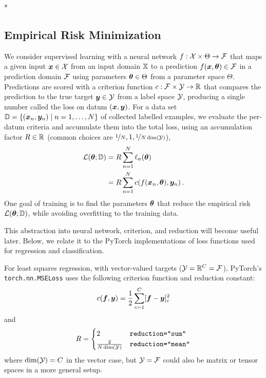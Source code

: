 \switchcolumn[1]*
\switchcolumn[0]

\subsection{Empirical Risk Minimization}

We consider supervised learning with a neural network $f: {\mathcal{X}} \times \Theta \to {\mathcal{F}}$ that maps a given input ${\bm{x}} \in {\mathcal{X}}$ from an input domain ${\mathbb{X}}$ to a prediction $f({\bm{x}}, {\bm{\theta}}) \in {\mathcal{F}}$ in a prediction domain ${\mathcal{F}}$ using parameters ${\bm{\theta}} \in \Theta$ from a parameter space $\Theta$.
Predictions are scored with a criterion function $c: {\mathcal{F}} \times {\mathcal{Y}} \to {\mathbb{R}}$ that compares the prediction to the true target ${\bm{y}} \in {\mathcal{Y}}$ from a label space ${\mathcal{Y}}$, producing a single number called the loss on datum $({\bm{x}}, {\bm{y}})$.
For a data set ${\mathbb{D}} = \{({\bm{x}}_n, {\bm{y}}_n) \mid n=1, \dots, N\}$ of collected labelled examples, we evaluate the per-datum criteria and accumulate them into the total loss, using an accumulation factor $R \in {\mathbb{R}}$ (common choices are $\nicefrac{1}{N}, 1, \nicefrac{1}{N \dim({\mathcal{Y}})}$),
\begin{align}\label{eq:empirical_risk}
  \begin{split}
    {\mathcal{L}}({\bm{\theta}}; {\mathbb{D}}) &= R \sum_{n=1}^N \ell_n({\bm{\theta}})
    \\
                      &= R \sum_{n=1}^N c(f({\bm{x}}_n, {\bm{\theta}}), {\bm{y}}_n)\,.
  \end{split}
\end{align}
One goal of training is to find the parameters ${\bm{\theta}}$ that reduce the empirical risk ${\mathcal{L}}({\bm{\theta}}; {\mathbb{D}})$, while avoiding overfitting to the training data.

This abstraction into neural network, criterion, and reduction will become useful later.
Below, we relate it to the PyTorch implementations of loss functions used for regression and classification.

\begin{example}\label{ex:square_loss}
  For least squares regression, with vector-valued targets (${\mathcal{Y}} = {\mathbb{R}}^C = {\mathcal{F}}$), PyTorch's \texttt{torch.nn.MSELoss} uses the following criterion function and reduction constant:
  \begin{align*}
    c({\bm{f}}, {\bm{y}})
    =
    \frac{1}{2}\sum_{c=1}^C [{\bm{f}} - {\bm{y}}]_c^2
  \end{align*}
  and
  \begin{align*}
    R
    =
    \begin{cases}
      2 & \text{\texttt{reduction="sum"}}
      \\
      \frac{2}{N \dim({\mathcal{Y}})} & \text{\texttt{reduction="mean"}}
    \end{cases}
  \end{align*}
  where $\dim({\mathcal{Y}}) = C$ in the vector case, but ${\mathcal{Y}} = {\mathcal{F}}$ could also be matrix or tensor spaces in a more general setup.
\end{example}


